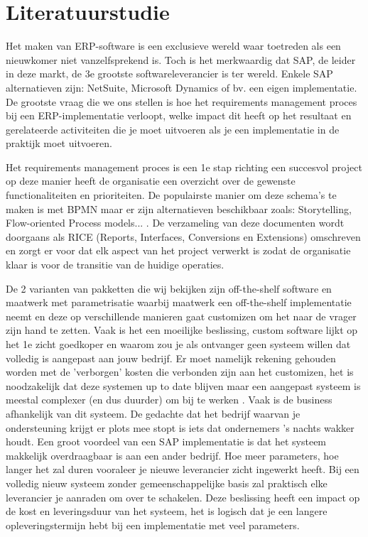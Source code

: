 
\chapter{Literatuurstudie}
\label{ch:literatuurstudie}

Het maken van ERP-software is een exclusieve wereld waar toetreden als een nieuwkomer niet vanzelfsprekend is. Toch is het merkwaardig dat SAP, de leider in deze markt, de 3e grootste softwareleverancier is ter wereld. Enkele SAP alternatieven zijn: NetSuite, Microsoft Dynamics of bv. een eigen implementatie.
De grootste vraag die we ons stellen is hoe het requirements management proces bij een ERP-implementatie verloopt, welke impact dit heeft op het resultaat en gerelateerde activiteiten die je moet uitvoeren als je een implementatie in de praktijk moet uitvoeren. 

Het requirements management proces is een 1e stap richting een succesvol project \autocite{Williamson2018} op deze manier heeft de organisatie een overzicht over de gewenste functionaliteiten en prioriteiten. De populairste manier om deze schema's te maken is met BPMN maar er zijn alternatieven beschikbaar zoals: Storytelling, Flow-oriented Process models... \autocite{Lillehagen2009}. De verzameling van deze documenten wordt doorgaans als RICE (Reports, Interfaces, Conversions en Extensions) omschreven \autocite{Williamson2018} en zorgt er voor dat elk aspect van het project verwerkt is zodat de organisatie klaar is voor de transitie van de huidige operaties. 

De 2 varianten van pakketten die wij bekijken zijn off-the-shelf software en maatwerk met parametrisatie waarbij maatwerk een off-the-shelf implementatie neemt en deze op verschillende manieren gaat customizen om het naar de vrager zijn hand te zetten. Vaak is het een moeilijke beslissing, custom software lijkt op het 1e zicht goedkoper en waarom zou je als ontvanger geen systeem willen dat volledig is aangepast aan jouw bedrijf. Er moet namelijk rekening gehouden worden met de 'verborgen' kosten die verbonden zijn aan het customizen, het is noodzakelijk dat deze systemen up to date blijven maar een aangepast systeem is meestal complexer (en dus duurder) om bij te werken \autocite{Bdc2019}. Vaak is de business afhankelijk van dit systeem. De gedachte dat het bedrijf waarvan je ondersteuning krijgt er plots mee stopt is iets dat ondernemers 's nachts wakker houdt. Een groot voordeel van een SAP implementatie is dat het systeem makkelijk overdraagbaar is aan een ander bedrijf. Hoe meer parameters, hoe langer het zal duren vooraleer je nieuwe leverancier zicht ingewerkt heeft. Bij een volledig nieuw systeem zonder gemeenschappelijke basis zal praktisch elke leverancier je aanraden om over te schakelen. Deze beslissing heeft een impact op de kost en leveringsduur van het systeem, het is logisch dat je een langere opleveringstermijn hebt bij een implementatie met veel parameters.

